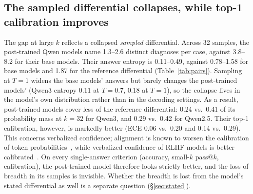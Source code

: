 \documentclass[wcp]{jmlr}
\begin{document}
\subsection{The sampled differential collapses, while top-1 calibration improves}\label{sec:collapse}
The gap at large $k$ reflects a collapsed \emph{sampled} differential.
Across 32 samples, the post-trained Qwen models name 1.3--2.6 distinct diagnoses per case, against 3.8--8.2 for their base models.
Their answer entropy is 0.11--0.49, against 0.78--1.58 for base models and 1.87 for the reference differential (Table~\ref{tab:pairs}).
Sampling at $T{=}1$ widens the base models' answers but barely changes the post-trained models' (Qwen3 entropy 0.11 at $T{=}0.7$, 0.18 at $T{=}1$), so the collapse lives in the model's own distribution rather than in the decoding settings.
As a result, post-trained models cover less of the reference differential: 0.24 vs.\ 0.41 of its probability mass at $k{=}32$ for Qwen3, and 0.29 vs.\ 0.42 for Qwen2.5.
Their top-1 calibration, however, is markedly better (ECE 0.06 vs.\ 0.20 and 0.14 vs.\ 0.29). This concerns verbalized confidence; alignment is known to worsen the calibration of token probabilities~\citep{openai2023gpt4,zhu2023calibration}, while verbalized confidence of RLHF models is better calibrated~\citep{tian2023justask}.
On every single-answer criterion (accuracy, small-$k$ pass@$k$, calibration), the post-trained model therefore looks strictly better, and the loss of breadth in its samples is invisible. Whether the breadth is lost from the model's stated differential as well is a separate question (\S\ref{sec:stated}).
\end{document}
